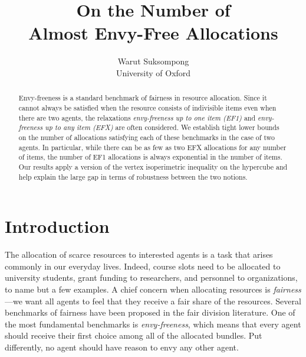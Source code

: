 \documentclass[11pt]{scrartcl}
\title{On the Number of \\Almost Envy-Free Allocations}
\author{
Warut Suksompong\\University of Oxford
}
\date{\vspace{-3ex}}
\theoremstyle{definition}
\begin{document}
\maketitle

\begin{abstract}
Envy-freeness is a standard benchmark of fairness in resource allocation. 
Since it cannot always be satisfied when the resource consists of indivisible items even when there are two agents, the relaxations \emph{envy-freeness up to one item (EF1)} and \emph{envy-freeness up to any item (EFX)} are often considered.
We establish tight lower bounds on the number of allocations satisfying each of these benchmarks in the case of two agents.
In particular, while there can be as few as two EFX allocations for any number of items, the number of EF1 allocations is always exponential in the number of items.
Our results apply a version of the vertex isoperimetric inequality on the hypercube and help explain the large gap in terms of robustness between the two notions.
\end{abstract}

\section{Introduction}

The allocation of scarce resources to interested agents is a task that arises commonly in our everyday lives.
Indeed, course slots need to be allocated to university students, grant funding to researchers, and personnel to organizations, to name but a few examples.
A chief concern when allocating resources is \emph{fairness}---we want all agents to feel that they receive a fair share of the resources.
Several benchmarks of fairness have been proposed in the fair division literature.
One of the most fundamental benchmarks is \emph{envy-freeness}, which means that every agent should receive their first choice among all of the allocated bundles.
Put differently, no agent should have reason to envy any other agent.
\end{document}
